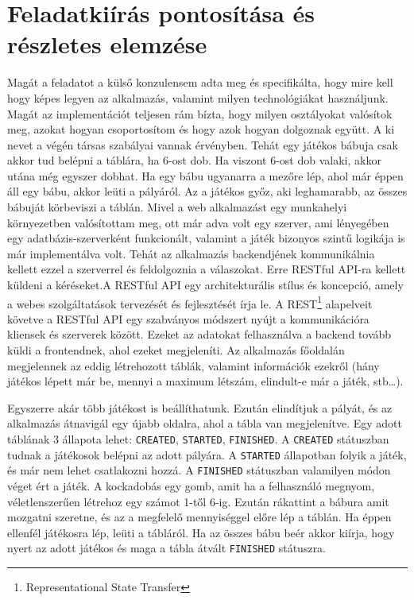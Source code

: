 \documentclass[a4paper,twoside]{article}
\begin{document}
\section{Feladatkiírás pontosítása és részletes elemzése}
Magát a feladatot a külső konzulensem adta meg és specifikálta, hogy mire kell hogy képes
legyen az alkalmazás, valamint milyen technológiákat használjunk. Magát az implementációt
teljesen rám bízta, hogy milyen osztályokat valósítok meg, azokat hogyan csoportosítom és
hogy azok hogyan dolgoznak együtt.
A ki nevet a végén társas szabályai vannak érvényben. Tehát egy játékos bábuja csak akkor
tud belépni a táblára, ha 6-ost dob. Ha viszont 6-ost dob valaki, akkor utána még egyszer
dobhat. Ha egy bábu ugyanarra a mezőre lép, ahol már éppen áll egy bábu, akkor leüti a
pályáról. Az a játékos győz, aki leghamarabb, az összes bábuját körbeviszi a táblán.
Mivel a web alkalmazást egy munkahelyi környezetben valósítottam meg, ott már adva volt
egy szerver, ami lényegében egy adatbázis-szerverként funkcionált, valamint a játék bizonyos
szintű logikája is már implementálva volt. Tehát az alkalmazás backendjének kommunikálnia
kellett ezzel a szerverrel és feldolgoznia a válaszokat. Erre RESTful API-ra kellett küldeni a
kéréseket.A RESTful API egy architekturális stílus és koncepció, amely a webes szolgáltatások
tervezését és fejlesztését írja le. A REST\footnote{Representational State Transfer} alapelveit követve
a RESTful API egy szabványos módszert nyújt a kommunikációra kliensek és szerverek
között. Ezeket az adatokat felhasználva a backend tovább küldi a frontendnek, ahol ezeket
megjeleníti.
Az alkalmazás főoldalán megjelennek az eddig létrehozott táblák, valamint információk
ezekről (hány játékos lépett már be, mennyi a maximum létszám, elindult-e már a játék,
stb\ldots). 

Egyszerre akár több játékost is beállíthatunk. Ezután elindítjuk a pályát, és az alkalmazás átnavigál egy
újabb oldalra, ahol a tábla van megjelenítve. Egy adott táblának 3 állapota lehet: \verb|CREATED|,
\verb|STARTED|, \verb|FINISHED|. A \verb|CREATED| státuszban tudnak a játékosok belépni az adott pályára. A \verb|STARTED| állapotban folyik a játék, és már nem lehet csatlakozni hozzá. A \verb|FINISHED| státuszban valamilyen módon véget ért a játék. A kockadobás egy gomb, amit ha a
felhasználó megnyom, véletlenszerűen létrehoz egy számot 1-től 6-ig. Ezután rákattint a bábura amit mozgatni
szeretne, és az a megfelelő mennyiséggel előre lép a táblán. Ha éppen ellenfél játékosra lép,
leüti a tábláról. Ha az összes bábu beér akkor kiírja, hogy nyert az adott játékos és maga a
tábla átvált \verb|FINISHED| státuszra.
\end{document}

